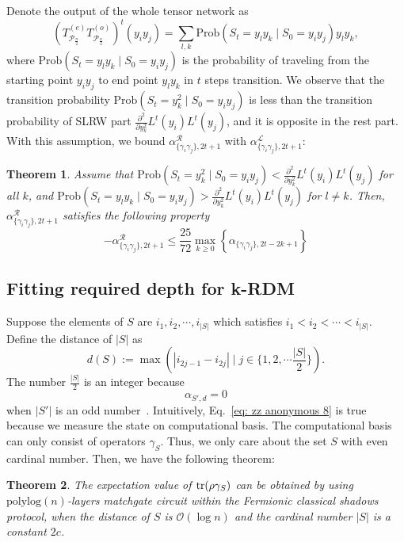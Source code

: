 \documentclass{article}
\newtheorem{theorem}{Theorem}
\newcommand{\Tcouple}{T^{(e)}_{\mathcal{P}_\frac{n}{2}} T^{(o)}_{\mathcal{P}_\frac{n}{2}}}
\newcommand{\polylog}{\mathrm{polylog}}
\newcommand{\alpl}{\alpha_{\{\gamma_i\gamma_j\}, 2t+1}^{\mathscr{L}}}
\newcommand{\alpr}{\alpha_{\{\gamma_i\gamma_j\}, 2t+1}^{\mathscr{R}}}
\begin{document}
Denote the output of the whole tensor network as 
\begin{equation}
    \left(\Tcouple\right)^t ( y_i y_j) = \sum_{l,k} \mathrm{Prob}(S_t = y_l y_k \mid S_0 = y_i y_j) y_l y_k, 
\end{equation}
where $\mathrm{Prob}(S_t = y_l y_k \mid S_0 = y_i y_j)$ is the probability of traveling from the starting point $y_iy_j$ to end point $y_ly_k$ in $t$ steps transition. We observe that the transition probability $\mathrm{Prob}(S_t = y_k^2 \mid S_0 = y_i y_j)$ is less than the transition probability of SLRW part $\frac{\partial^2}{\partial y_k^2} L^t(y_i)L^t(y_j) $, and it is opposite in the rest part. With this assumption, we bound $\alpr$ with $\alpl$:
\begin{theorem}
\label{theorem: relation between alpha L and alpha R}
    Assume that $\mathrm{Prob}(S_t = y_k^2\mid S_0 = y_i y_j) < \frac{\partial^2}{\partial y_k^2} L^t(y_i)L^t(y_j) $ for all $k$, and $\mathrm{Prob}(S_t = y_l y_k \mid S_0 = y_i y_j) > \frac{\partial^2}{\partial y_k^2} L^t(y_i)L^t(y_j)$ for $l\neq k$. Then, $\alpr$ satisfies the following property
    \begin{equation}
        -\alpr \leq \frac{25}{72} \max_{k \geq 0}\left\{ \alpha_{\{\gamma_i\gamma_j\}, 2t-2k+1} \right\}
    \end{equation}
\end{theorem}





\subsection{Fitting required depth for k-RDM}
Suppose the elements of $S$ are $i_1, i_2, \cdots, i_{|S|}$ which satisfies $i_1 < i_2 < \cdots < i_{|S|}$.
Define the distance of $|S|$ as
\begin{equation}
    d(S) := \max(|i_{2j-1}-i_{2j}|\mid j \in \{1, 2, \cdots \frac{|S|}{2}\}).
\end{equation}
The number $\frac{|S|}{2}$ is an integer because 
\begin{equation}
    \alpha_{S', d} =0
    \label{eq: zz anonymous 8}
\end{equation}
when $|S'|$ is an odd number~\cite{wan2022matchgate}. Intuitively, Eq.~\eqref{eq: zz anonymous 8} is true because we measure the state on computational basis. The computational basis can only consist of operators $\gamma_S$. Thus, we only care about the set $S$ with even cardinal number.
Then, we have the following theorem:
\begin{theorem}
The expectation value of $\tr(\rho \gamma_S)$ can be obtained by using $\polylog(n)$-layers matchgate circuit within the Fermionic classical shadows protocol, when the distance of $S$ is $\mathcal{O}(\log n)$ and the cardinal number $|S|$ is a constant $2c$.
\end{theorem}
\end{document}
